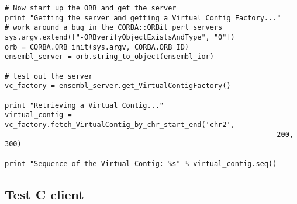 \documentclass[11pt,a4paper]{article}
\begin{document}
\begin{verbatim}
# Now start up the ORB and get the server
print "Getting the server and getting a Virtual Contig Factory..."
# work around a bug in the CORBA::ORBit perl servers
sys.argv.extend(["-ORBverifyObjectExistsAndType", "0"])
orb = CORBA.ORB_init(sys.argv, CORBA.ORB_ID)
ensembl_server = orb.string_to_object(ensembl_ior)

# test out the server
vc_factory = ensembl_server.get_VirtualContigFactory()

print "Retrieving a Virtual Contig..."
virtual_contig = vc_factory.fetch_VirtualContig_by_chr_start_end('chr2',
                                                                 200, 300)

print "Sequence of the Virtual Contig: %s" % virtual_contig.seq()
\end{verbatim}

\subsection{Test C client}
\end{document}
